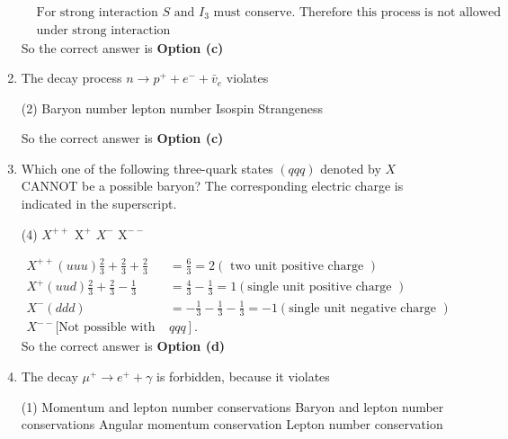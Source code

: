 \begin{enumerate}
\begin{answer}
\begin{align*}
	&\text{For strong interaction $S$ and $I_3$ must conserve. Therefore this process is not allowed }\\
	&\text{under strong interaction}
	\end{align*}
		So the correct answer is \textbf{Option (c)}
\end{answer}
	\item  The decay process $n \rightarrow p^{+}+e^{-}+\bar{v}_e$ violates
	{}
	 \begin{tasks}(2)
		\task[\textbf{a.}]Baryon number
		\task[\textbf{b.}] lepton number
		\task[\textbf{c.}] Isospin
		\task[\textbf{d.}] Strangeness
	\end{tasks}
\begin{answer}
		So the correct answer is \textbf{Option (c)}
\end{answer}
	\item  Which one of the following three-quark states $(q q q)$ denoted by $X$ CANNOT be a possible baryon? The corresponding electric charge is indicated in the superscript.
	{}
	 \begin{tasks}(4)
		\task[\textbf{a.}]$X^{++}$
		\task[\textbf{b.}]$\mathrm{X}^{+}$
		\task[\textbf{c.}]$X^{-}$
		\task[\textbf{d.}] $\mathrm{X}^{--}$ 
	\end{tasks}
\begin{answer}
	\begin{align*}
	X^{++}(u u u) \frac{2}{3}+\frac{2}{3}+\frac{2}{3}&=\frac{6}{3}=2(\text{ two unit positive charge })\\
	X^{+}(u u d) \frac{2}{3}+\frac{2}{3}-\frac{1}{3}&=\frac{4}{3}-\frac{1}{3}=1( \text{single unit positive charge })\\
	X^{-}(d d d)&=-\frac{1}{3}-\frac{1}{3}-\frac{1}{3}=-1 (\text{single unit negative charge })\\
	X^{--}\text{[Not possible with }&\left.q q q\right]. 
	\end{align*}
		So the correct answer is \textbf{Option (d)}
\end{answer}
	\item  The decay $\mu^{+} \rightarrow e^{+}+\gamma$ is forbidden, because it violates
	{}
	 \begin{tasks}(1)
		\task[\textbf{a.}] Momentum and lepton number conservations
		\task[\textbf{b.}]Baryon and lepton number conservations
		\task[\textbf{c.}]Angular momentum conservation
		\task[\textbf{d.}]  Lepton number conservation
	\end{tasks}
\begin{answer}

\end{answer}
\end{enumerate}

